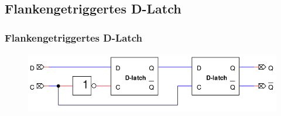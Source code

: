 \subsection{Flankengetriggertes D-Latch} %
\label{sub:Flankengetriggertes D-Latch}
\begin{frame}
    \frametitle{Flankengetriggertes D-Latch}
    \framesubtitle{}
     \begin{figure}[H]
     \begin{center}
             \includegraphics[scale=0.3]{./img/schaltung/flanken_d.png}
     \end{center}
     \end{figure}
\end{frame}
